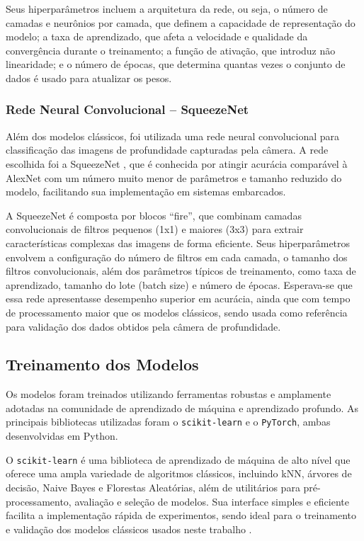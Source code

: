 Seus hiperparâmetros incluem a arquitetura da rede, ou seja, o número de camadas e neurônios por camada, que definem a capacidade de representação do modelo; a taxa de aprendizado, que afeta a velocidade e qualidade da convergência durante o treinamento; a função de ativação, que introduz não linearidade; e o número de épocas, que determina quantas vezes o conjunto de dados é usado para atualizar os pesos.

\subsubsection{Rede Neural Convolucional – SqueezeNet}

Além dos modelos clássicos, foi utilizada uma rede neural convolucional para classificação das imagens de profundidade capturadas pela câmera. A rede escolhida foi a SqueezeNet \cite{SqueezeNet}, que é conhecida por atingir acurácia comparável à AlexNet com um número muito menor de parâmetros e tamanho reduzido do modelo, facilitando sua implementação em sistemas embarcados.

A SqueezeNet é composta por blocos “fire”, que combinam camadas convolucionais de filtros pequenos (1x1) e maiores (3x3) para extrair características complexas das imagens de forma eficiente. Seus hiperparâmetros envolvem a configuração do número de filtros em cada camada, o tamanho dos filtros convolucionais, além dos parâmetros típicos de treinamento, como taxa de aprendizado, tamanho do lote (batch size) e número de épocas. Esperava-se que essa rede apresentasse desempenho superior em acurácia, ainda que com tempo de processamento maior que os modelos clássicos, sendo usada como referência para validação dos dados obtidos pela câmera de profundidade.

\subsection{Treinamento dos Modelos}

Os modelos foram treinados utilizando ferramentas robustas e amplamente adotadas na comunidade de aprendizado de máquina e aprendizado profundo. As principais bibliotecas utilizadas foram o \texttt{scikit-learn} e o \texttt{PyTorch}, ambas desenvolvidas em Python.

O \texttt{scikit-learn} é uma biblioteca de aprendizado de máquina de alto nível que oferece uma ampla variedade de algoritmos clássicos, incluindo kNN, árvores de decisão, Naive Bayes e Florestas Aleatórias, além de utilitários para pré-processamento, avaliação e seleção de modelos. Sua interface simples e eficiente facilita a implementação rápida de experimentos, sendo ideal para o treinamento e validação dos modelos clássicos usados neste trabalho \cite{pedregosa2011scikit}.

